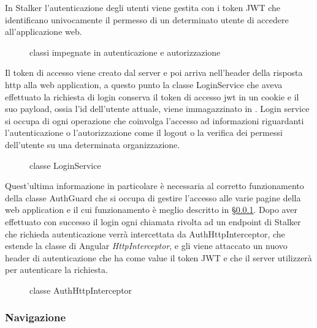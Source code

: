 \documentclass[../../manuale-manutentore.tex]{subfiles}
\begin{document}
In Stalker l'autenticazione degli utenti viene gestita con i token JWT che identificano univocamente il permesso di un determinato utente di accedere all'applicazione web.
\begin{figure}[H]
  \centering
  \caption{classi impegnate in autenticazione e autorizzazione}%
  \label{fig:web-app-auth}
\end{figure}
Il token di accesso viene creato dal server e poi arriva nell'header della risposta http alla web application, a questo punto la classe LoginService che aveva effettuato la richiesta di login conserva il token di accesso jwt in un cookie e il suo payload, ossia l'id dell'utente attuale, viene immagazzinato in .
Login service si occupa di ogni operazione che coinvolga l'accesso ad informazioni riguardanti l'autenticazione o l'autorizzazione come il logout o la verifica dei permessi dell'utente su una determinata organizzazione.
\begin{figure}[H]
  \centering
  \caption{classe LoginService}%
  \label{fig:web-app-loginservice}
\end{figure}
Quest'ultima informazione in particolare è necessaria al corretto funzionamento della classe AuthGuard che si occupa di gestire l'accesso alle varie pagine della web application e il cui funzionamento è meglio descritto in §\ref{subs:navigazione}.
Dopo aver effettuato con successo il login ogni chiamata rivolta ad un endpoint di Stalker che richieda autenticazione verrà intercettata da AuthHttpInterceptor, che estende la classe di Angular \textit{HttpInterceptor}, e gli viene attaccato un nuovo header di autenticazione che ha come value il token JWT e che il server utilizzerà per autenticare la richiesta.
\begin{figure}[H]
  \centering
  \caption{classe AuthHttpInterceptor}%
  \label{fig:web-app-authhttpinterceptor}
\end{figure}

\subsubsection{Navigazione}%
\label{subs:navigazione}
\end{document}

